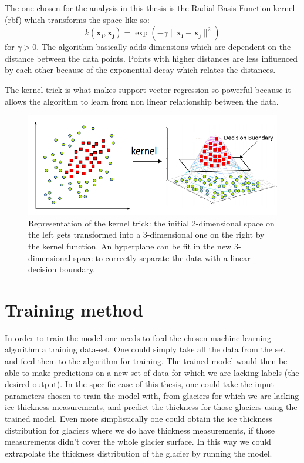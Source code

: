 The one chosen for the analysis in this thesis is the Radial Basis Function kernel (rbf) which transforms the space like so:
\begin{equation}\label{eq:rbf}
k({\mathbf {x_{i}}},{\mathbf {x_{j}}})=\exp(-\gamma \|\mathbf {x_{i}}-\mathbf {x_{j}}\|^{2})
\end{equation}
for $\gamma >0$.
The algorithm basically adds dimensions which are dependent on the distance between the data points. Points with higher distances are less influenced by each other because of the exponential decay which relates the distances.

The kernel trick is what makes support vector regression so powerful because it allows the algorithm to learn from non linear relationship between the data.

\begin{figure}[!tp]
	\centering		  
	\includegraphics[width=1.\textwidth]{figures/kernel_trick.png}
	\caption{Representation of the kernel trick: the initial 2-dimensional space on the left gets transformed into a 3-dimensional one on the right by the kernel function. An hyperplane can be fit in the new 3-dimensional space to correctly separate the data with a linear decision boundary.}
	\label{fig:kernel}
\end{figure}


\section{Training method}\label{training}
In order to train the model one needs to feed the chosen machine learning algorithm a training data-set. One could simply take all the data from the set and feed them to the algorithm for training. The trained model would then be able to make predictions on a new set of data for which we are lacking labels (the desired output). In the specific case of this thesis, one could take the input parameters chosen to train the model with, from glaciers for which we are lacking ice thickness measurements, and predict the thickness for those glaciers using the trained model. Even more simplistically one could obtain the ice thickness distribution for glaciers where we do have thickness measurements, if those measurements didn't cover the whole glacier surface. In this way we could extrapolate the thickness distribution of the glacier by running the model.

